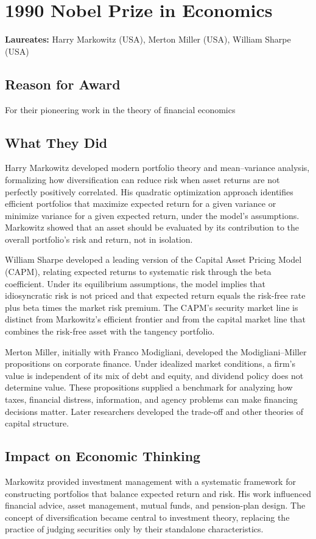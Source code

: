 \chapter{1990 Nobel Prize in Economics}
\textbf{Laureates: }Harry Markowitz (USA), Merton Miller (USA), William Sharpe (USA)

\section*{Reason for Award}
For their pioneering work in the theory of financial economics

\section{What They Did}
Harry Markowitz developed modern portfolio theory and mean--variance analysis,
formalizing how diversification can reduce risk when asset returns are not
perfectly positively correlated. His quadratic optimization approach identifies
efficient portfolios that maximize expected return for a given variance or
minimize variance for a given expected return, under the model's assumptions.
Markowitz showed that an asset should be evaluated by its contribution to the
overall portfolio's risk and return, not in isolation.

William Sharpe developed a leading version of the Capital Asset Pricing Model
(CAPM), relating expected returns to systematic risk through the beta
coefficient. Under its equilibrium assumptions, the model implies that
idiosyncratic risk is not priced and that expected return equals the risk-free
rate plus beta times the market risk premium. The CAPM's security market line
is distinct from Markowitz's efficient frontier and from the capital market
line that combines the risk-free asset with the tangency portfolio.

Merton Miller, initially with Franco Modigliani, developed the
Modigliani--Miller propositions on corporate finance. Under idealized market
conditions, a firm's value is independent of its mix of debt and equity, and
dividend policy does not determine value. These propositions supplied a
benchmark for analyzing how taxes, financial distress, information, and agency
problems can make financing decisions matter. Later researchers developed the
trade-off and other theories of capital structure.

\section{Impact on Economic Thinking}
Markowitz provided investment management with a systematic framework for
constructing portfolios that balance expected return and risk. His work
influenced financial advice, asset management, mutual funds, and pension-plan
design. The concept of diversification became central to investment theory,
replacing the practice of judging securities only by their standalone
characteristics.

